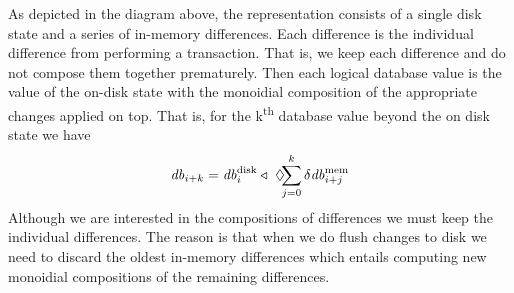 \documentclass[11pt,a4paper]{article}
\begin{document}
\begin{center}
\end{center}
As depicted in the diagram above, the representation consists of a single disk
state and a series of in-memory differences. Each difference is the individual
difference from performing a transaction. That is, we keep each difference and
do not compose them together prematurely. Then each logical database value is
the value of the on-disk state with the monoidial composition of the appropriate
changes applied on top. That is, for the k\textsuperscript{th} database value
beyond the on disk state we have
\[
\mathit{db}_{i+k}
= \mathit{db}^{\mathrm{disk}}_i \triangleleft ~
            \displaystyle\Diamond\hspace{-4pt}\sum_{j=0}^k{\delta\mathit{db}^{\mathrm{mem}}_{i+j}}
\]
Although we are interested in the compositions of differences we must keep the
individual differences. The reason is that when we do flush changes to disk we
need to discard the oldest in-memory differences which entails computing new
monoidial compositions of the remaining differences.
\end{document}

